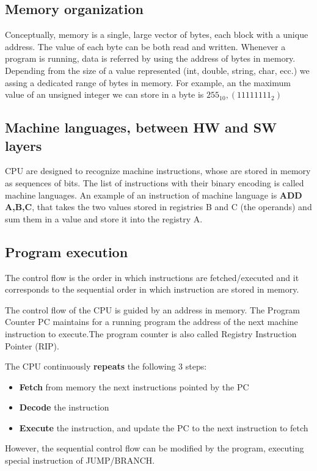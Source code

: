 \subsection{Memory organization}

Conceptually, memory is a single, large vector of bytes, each block with a unique address.
The value of each byte can be both read and written. Whenever a program is running, data is referred by using the address of bytes in memory. Depending from the size of a value represented (int, double, string, char, ecc.) we assing a dedicated range of bytes in memory. For example, an the maximum value of an unsigned integer we can store in a byte is $255_10, (11111111_2)$ 

\subsection{Machine languages, between HW and SW layers}

CPU are designed to recognize machine instructions, whose are stored in memory as sequences of bits. \newline
The list of instructions with their binary encoding is called machine languages. \newline 
An example of an instruction of machine language is \textbf{ADD A,B,C}, that takes the two values stored in registries B and C (the operands) and sum them in a value and store it into the registry A. 

\subsection{Program execution}

The control flow is the order in which instructions are fetched/executed and it corresponds to the sequential order in which instruction are stored in memory. 
\par
The control flow of the CPU is guided by an address in memory.\newline
The Program Counter PC maintains for a running program the address of the next machine instruction to execute.The program counter is also called Registry Instruction Pointer (RIP).
\par 
The CPU continuously \textbf{repeats} the following 3 steps:
\begin{itemize}
    \item \textbf{Fetch} from memory the next instructions pointed by the PC
    \item \textbf{Decode} the instruction
    \item \textbf{Execute} the instruction, and update the PC to the next instruction to fetch
\end{itemize}
\par 
However, the sequential control flow can be modified by the program,
executing special instruction of JUMP/BRANCH.

